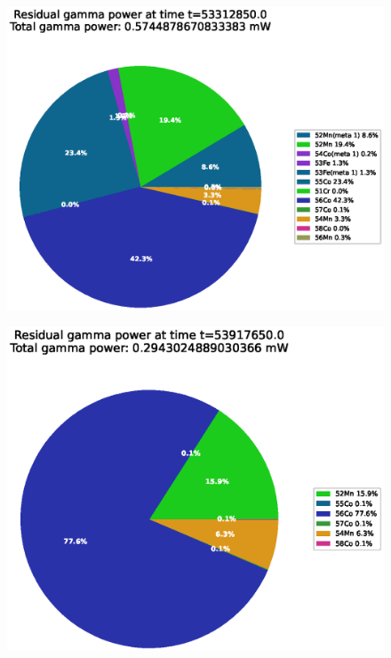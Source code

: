 \begin{figure}[!htb]
\centering
\includegraphics[width=0.7\linewidth]{chapters/activity_code/fe_100dpa/endofbeam/30MeV_0400_53312850.eps}
\caption{}
\label{fig:5mev-proton-100dpa}
\end{figure}

\begin{figure}[!htb]
\centering
\includegraphics[width=0.7\linewidth]{chapters/activity_code/fe_100dpa/endofbeam/30MeV_0500_53917650.eps}
\caption{}
\label{fig:5mev-proton-100dpa}
\end{figure}



